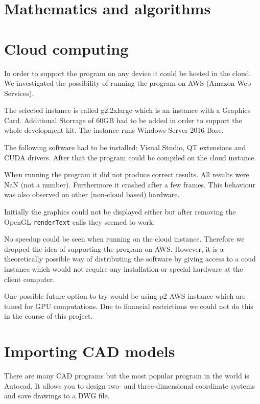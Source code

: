 \documentclass[a4paper, 11pt, article]{report}
\begin{document}
\section{Mathematics and algorithms}

\section{Cloud computing}

In order to support the program on any device it could be hosted in the cloud. We investigated the possibility of running the program on AWS (Amazon Web Services). 

The selected instance is called g2.2xlarge which is an instance with a Graphics Card.
Additional Storrage of 60GB had to be added in order to support the whole development kit.
The instance runs Windows Server 2016 Base. 

The following software had to be installed: Visual Studio, QT extensions and CUDA drivers.
After that the program could be compiled on the cloud instance.

When running the program it did not produce correct results. All results were NaN (not a number).
Furthermore it crashed after a few frames. This behaviour was also observed on other (non-cloud based) hardware.

Initially the graphics could not be displayed either but after removing the OpenGL \texttt{renderText} calls 
they seemed to work. 

No speedup could be seen when running on the cloud instance. Therefore we dropped the idea of supporting the program on AWS.
However, it is a theoretically possible way of distributing the software by giving access to a coud instance 
which would not require any installation or special hardware at the client computer. 

One possible future option to try would be using p2 AWS instance which are tuned for GPU computations. Due to financial restrictions we could not do this in the course of this project.

\section{Importing CAD models}
   
There are many CAD programs but the most popular program in the world is Autocad. It allows you to design two- and three-dimensional coordinate systems and save drawings to a DWG file.
\end{document}
